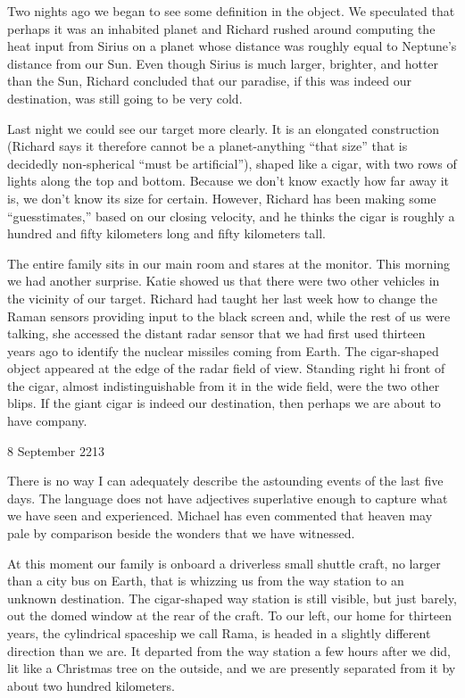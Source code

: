 \documentclass[]{article}
\begin{document}
{Two nights ago we began to see some definition in the object.  We speculated that perhaps it was an inhabited planet and Richard rushed around computing the heat input from Sirius on a planet whose distance was roughly equal to Neptune’s distance from our Sun.  Even though Sirius is much larger, brighter, and hotter than the Sun, Richard concluded that our paradise, if this was indeed our destination, was still going to be very cold.

Last night we could see our target more clearly.  It is an elongated construction (Richard says it therefore cannot be a planet-anything “that size” that is decidedly non-spherical “must be artificial”), shaped like a cigar, with two rows of lights along the top and bottom.  Because we don’t know exactly how far away it is, we don’t know its size for certain.  However, Richard has been making some “guesstimates,” based on our closing velocity, and he thinks the cigar is roughly a hundred and fifty kilometers long and fifty kilometers tall.

The entire family sits in our main room and stares at the monitor.  This morning we had another surprise.  Katie showed us that there were two other vehicles in the vicinity of our target.  Richard had taught her last week how to change the Raman sensors providing input to the black screen and, while the rest of us were talking, she accessed the distant radar sensor that we had first used thirteen years ago to identify the nuclear missiles coming from Earth.  The cigar-shaped object appeared at the edge of the radar field of view.  Standing right hi front of the cigar, almost indistinguishable from it in the wide field, were the two other blips.  If the giant cigar is indeed our destination, then perhaps we are about to have company.

8 September 2213

There is no way I can adequately describe the astounding events of the last five days.  The language does not have adjectives superlative enough to capture what we have seen and experienced.  Michael has even commented that heaven may pale by comparison beside the wonders that we have witnessed.

At this moment our family is onboard a driverless small shuttle craft, no larger than a city bus on Earth, that is whizzing us from the way station to an unknown destination.  The cigar-shaped way station is still visible, but just barely, out the domed window at the rear of the craft.  To our left, our home for thirteen years, the cylindrical spaceship we call Rama, is headed in a slightly different direction than we are.  It departed from the way station a few hours after we did, lit like a Christmas tree on the outside, and we are presently separated from it by about two hundred kilometers.

}
\end{document}
